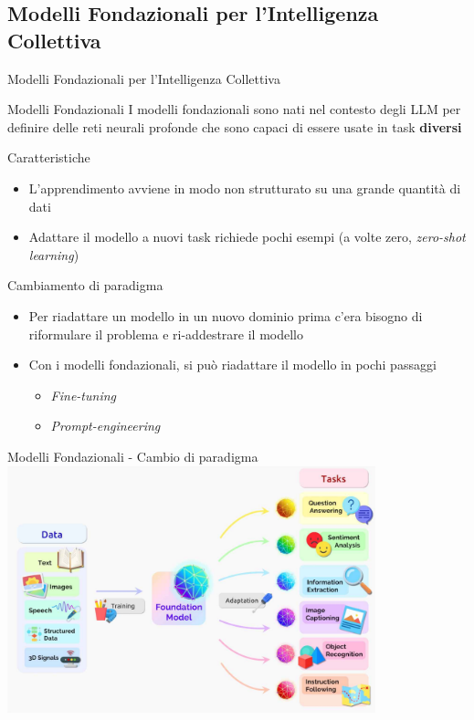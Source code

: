 \documentclass[presentation, 10pt,aspectratio=169]{beamer}\mode<presentation>{\usetheme{AMSBolognaFC}}
\begin{document}
\subsection{Modelli Fondazionali per l'Intelligenza Collettiva}
\begin{frame}{Modelli Fondazionali per l'Intelligenza Collettiva}
	\begin{exampleblock}{Modelli Fondazionali}
		I modelli fondazionali sono nati nel contesto degli LLM per definire delle reti neurali profonde che sono capaci di essere usate in task \textbf{diversi}
	\end{exampleblock}
	\begin{alertblock}{Caratteristiche}
		\begin{itemize}
			\item L'apprendimento avviene in modo non strutturato su una grande quantità di dati
			\item Adattare il modello a nuovi task richiede pochi esempi (a volte zero, \emph{zero-shot learning})
		\end{itemize}
	\end{alertblock}
	\begin{block}{Cambiamento di paradigma}
		\begin{itemize}
			\item Per riadattare un modello in un nuovo dominio prima c'era bisogno di riformulare il problema e ri-addestrare il modello
			\item Con i modelli fondazionali, si può riadattare il modello in pochi passaggi
			\begin{itemize}
				\item \emph{Fine-tuning}
				\item \emph{Prompt-engineering}
			\end{itemize}
		\end{itemize}
	\end{block}
\end{frame}
\begin{frame}{Modelli Fondazionali - Cambio di paradigma}
\centering
\includegraphics[width=0.8\textwidth]{img/fondational-models.png}
\end{frame}
\end{document}
